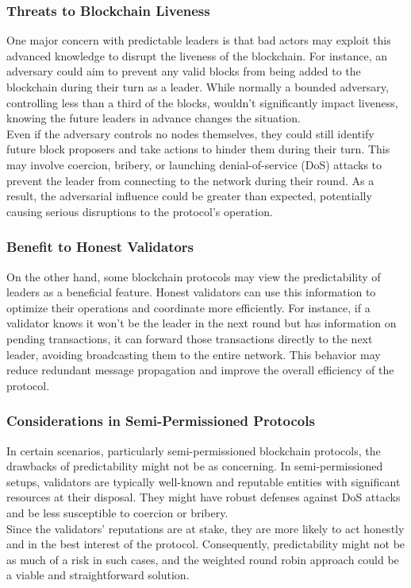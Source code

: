 \subsubsection{Threats to Blockchain Liveness}
One major concern with predictable leaders is that bad actors may exploit this advanced knowledge to disrupt the liveness of the blockchain. For instance, an adversary could aim to prevent any valid blocks from being added to the blockchain during their turn as a leader. While normally a bounded adversary, controlling less than a third of the blocks, wouldn't significantly impact liveness, knowing the future leaders in advance changes the situation.\\
Even if the adversary controls no nodes themselves, they could still identify future block proposers and take actions to hinder them during their turn. This may involve coercion, bribery, or launching denial-of-service (DoS) attacks to prevent the leader from connecting to the network during their round. As a result, the adversarial influence could be greater than expected, potentially causing serious disruptions to the protocol's operation.

\subsubsection{Benefit to Honest Validators}
On the other hand, some blockchain protocols may view the predictability of leaders as a beneficial feature. Honest validators can use this information to optimize their operations and coordinate more efficiently. For instance, if a validator knows it won't be the leader in the next round but has information on pending transactions, it can forward those transactions directly to the next leader, avoiding broadcasting them to the entire network. This behavior may reduce redundant message propagation and improve the overall efficiency of the protocol.

\subsubsection{Considerations in Semi-Permissioned Protocols}
In certain scenarios, particularly semi-permissioned blockchain protocols, the drawbacks of predictability might not be as concerning. In semi-permissioned setups, validators are typically well-known and reputable entities with significant resources at their disposal. They might have robust defenses against DoS attacks and be less susceptible to coercion or bribery.\\
Since the validators' reputations are at stake, they are more likely to act honestly and in the best interest of the protocol. Consequently, predictability might not be as much of a risk in such cases, and the weighted round robin approach could be a viable and straightforward solution.

